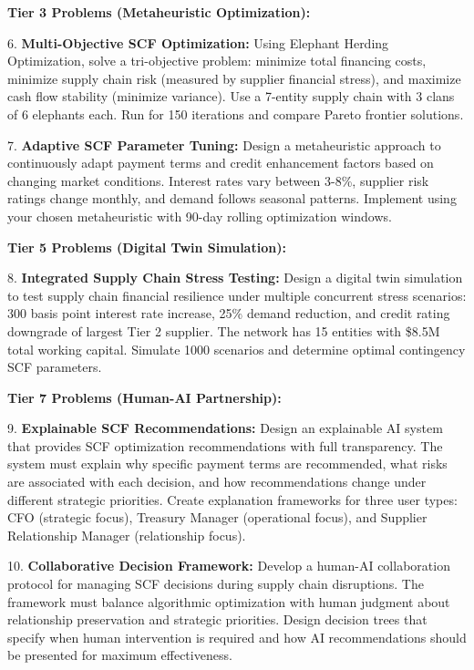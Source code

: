 \documentclass{article}
\begin{document}
\textbf{Tier 3 Problems (Metaheuristic Optimization):}

6. \textbf{Multi-Objective SCF Optimization:} Using Elephant Herding Optimization, solve a tri-objective problem: minimize total financing costs, minimize supply chain risk (measured by supplier financial stress), and maximize cash flow stability (minimize variance). Use a 7-entity supply chain with 3 clans of 6 elephants each. Run for 150 iterations and compare Pareto frontier solutions.

7. \textbf{Adaptive SCF Parameter Tuning:} Design a metaheuristic approach to continuously adapt payment terms and credit enhancement factors based on changing market conditions. Interest rates vary between 3-8\%, supplier risk ratings change monthly, and demand follows seasonal patterns. Implement using your chosen metaheuristic with 90-day rolling optimization windows.

\textbf{Tier 5 Problems (Digital Twin Simulation):}

8. \textbf{Integrated Supply Chain Stress Testing:} Design a digital twin simulation to test supply chain financial resilience under multiple concurrent stress scenarios: 300 basis point interest rate increase, 25\% demand reduction, and credit rating downgrade of largest Tier 2 supplier. The network has 15 entities with \$8.5M total working capital. Simulate 1000 scenarios and determine optimal contingency SCF parameters.

\textbf{Tier 7 Problems (Human-AI Partnership):}

9. \textbf{Explainable SCF Recommendations:} Design an explainable AI system that provides SCF optimization recommendations with full transparency. The system must explain why specific payment terms are recommended, what risks are associated with each decision, and how recommendations change under different strategic priorities. Create explanation frameworks for three user types: CFO (strategic focus), Treasury Manager (operational focus), and Supplier Relationship Manager (relationship focus).

10. \textbf{Collaborative Decision Framework:} Develop a human-AI collaboration protocol for managing SCF decisions during supply chain disruptions. The framework must balance algorithmic optimization with human judgment about relationship preservation and strategic priorities. Design decision trees that specify when human intervention is required and how AI recommendations should be presented for maximum effectiveness.
\end{document}
